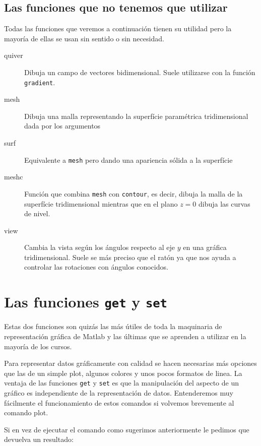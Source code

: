 \subsection{Las funciones que no tenemos que utilizar}

Todas las funciones que veremos a continuación tienen su utilidad
pero la mayoría de ellas se usan sin sentido o sin necesidad. 

\begin{description}
\item [quiver\texttt{}]Dibuja un campo de vectores bidimensional.
Suele utilizarse con la función \texttt{gradient}.
\item [mesh\texttt{}]Dibuja una malla representando la superfície
paramétrica tridimensional dada por los argumentos
\item [surf\texttt{}]Equivalente a \texttt{mesh} pero dando
una apariencia sólida a la superfície
\item [meshc\texttt{}]Función que combina \texttt{mesh} con
\texttt{contour}, es decir, dibuja la malla de la superfície tridimensional
mientras que en el plano $z=0$ dibuja las curvas de nivel.
\item [view]Cambia la vista según los ángulos respecto al
eje $y$ en una gráfica tridimensional. Suele se más preciso que el
ratón ya que nos ayuda a controlar las rotaciones con ángulos conocidos.
\end{description}

\section{Las funciones \texttt{get} y \texttt{set}}

Estas dos funciones son quizás las más útiles de toda la maquinaria de
representación gráfica de Matlab y las últimas que se aprenden a
utilizar en la mayoría de los cursos.

Para representar datos gráficamente con calidad se hacen necesarias
más opciones que las de un simple plot, algunos colores y unos pocos
formatos de linea. La ventaja de las funciones \texttt{get} y
\texttt{set} es que la manipulación del aspecto de un gráfico es
independiente de la representación de datos.  Entenderemos muy
fácilmente el funcionamiento de estos comandos si volvemos brevemente
al comando plot.

Si en vez de ejecutar el comando como sugerimos anteriormente le
pedimos que devuelva un resultado:

